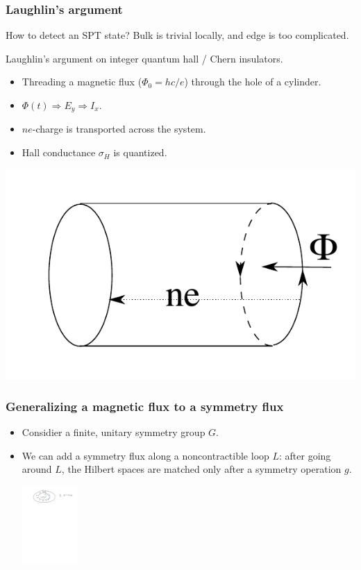 \documentclass[xcolor=table, aspectratio=169,ignorenonframetext]{beamer}
\begin{document}
\begin{frame}
  \frametitle{Laughlin's argument}
  \begin{block}{How to detect an SPT state?}
    Bulk is trivial locally, and edge is too complicated.
  \end{block}
  Laughlin's argument on integer quantum hall / Chern insulators.
  \begin{itemize}
  \item Threading a magnetic flux ($\Phi_0 = hc/e$) through the hole of a cylinder.
  \item $\Phi(t)\Rightarrow E_y\Rightarrow I_x$.
  \item $ne$-charge is transported across the system.
  \item Hall conductance $\sigma_H$ is quantized.
  \end{itemize}
  \begin{center}
    \includegraphics[scale=.5]{../spt-lecture/laughlin}
  \end{center}
\end{frame}

\begin{frame}
	\frametitle{Generalizing a magnetic flux to a symmetry flux}
	\begin{itemize}
		\item Considier a finite, unitary symmetry group $G$.
		\item We can add a symmetry flux along a noncontractible loop $L$: after going around $L$, the Hilbert spaces are matched only after a symmetry operation $g$.
		\begin{center}
			\includegraphics[height=3cm]{g-bundle}
		\end{center}
	\end{itemize}
\end{frame}
\end{document}
